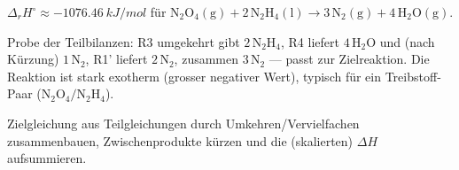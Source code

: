 \begin{ergebnis}
$\Delta_rH^\circ \approx \qty{-1076.46}{kJ/mol}$ für
$\mathrm{N_2O_4(g)} + 2\,\mathrm{N_2H_4(l)}
\rightarrow 3\,\mathrm{N_2(g)} + 4\,\mathrm{H_2O(g)}$.
\end{ergebnis}

\begin{kontrolle}
Probe der Teilbilanzen: R3 umgekehrt gibt $2\,\mathrm{N_2H_4}$, R4 liefert
$4\,\mathrm{H_2O}$ und (nach Kürzung) $1\,\mathrm{N_2}$,
R1' liefert $2\,\mathrm{N_2}$, zusammen $3\,\mathrm{N_2}$ --- passt zur
Zielreaktion. Die Reaktion ist stark exotherm (grosser negativer Wert),
typisch für ein Treibstoff-Paar ($\mathrm{N_2O_4}/\mathrm{N_2H_4}$).
\end{kontrolle}

\begin{merksatz}
Zielgleichung aus Teilgleichungen durch Umkehren/Vervielfachen zusammenbauen,
Zwischenprodukte kürzen und die (skalierten) $\Delta H$ aufsummieren.
\end{merksatz}
